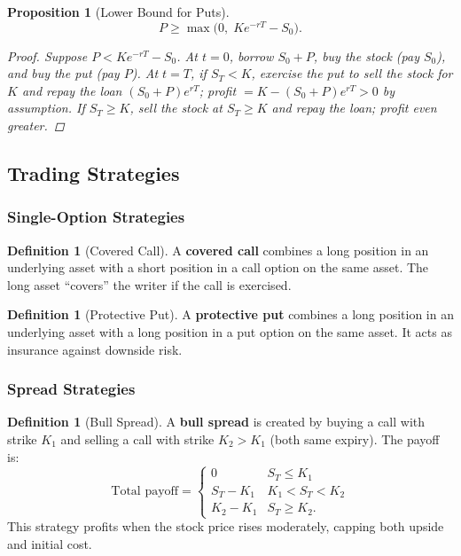 \documentclass[12pt, a4paper]{article}
\theoremstyle{plain}
\newtheorem{proposition}[theorem]{Proposition}
\theoremstyle{definition}
\newtheorem{definition}[theorem]{Definition}
\theoremstyle{remark}
\begin{document}
\begin{proposition}[Lower Bound for Puts]
  \[
    P \geq \max\!\bigl(0,\; Ke^{-rT} - S_0\bigr).
  \]
  \begin{proof}
    Suppose $P < Ke^{-rT} - S_0$. At $t=0$, borrow $S_0 + P$, buy the stock (pay $S_0$), and buy the put (pay $P$). At $t=T$, if $S_T < K$, exercise the put to sell the stock for $K$ and repay the loan $(S_0+P)e^{rT}$; profit $= K - (S_0+P)e^{rT} > 0$ by assumption. If $S_T \geq K$, sell the stock at $S_T \geq K$ and repay the loan; profit even greater.
  \end{proof}
\end{proposition}

\pagebreak
\subsection{Trading Strategies}

\subsubsection{Single-Option Strategies}

\begin{definition}[Covered Call]
  A \textbf{covered call} combines a long position in an underlying asset with a short position in a call option on the same asset. The long asset ``covers'' the writer if the call is exercised.
\end{definition}

\begin{definition}[Protective Put]
  A \textbf{protective put} combines a long position in an underlying asset with a long position in a put option on the same asset. It acts as insurance against downside risk.
\end{definition}

\subsubsection{Spread Strategies}

\begin{definition}[Bull Spread]
  A \textbf{bull spread} is created by buying a call with strike $K_1$ and selling a call with strike $K_2 > K_1$ (both same expiry). The payoff is:
  \[
    \text{Total payoff} = \begin{cases} 0 & S_T \leq K_1 \\ S_T - K_1 & K_1 < S_T < K_2 \\ K_2 - K_1 & S_T \geq K_2. \end{cases}
  \]
  This strategy profits when the stock price rises moderately, capping both upside and initial cost.
\end{definition}
\end{document}

